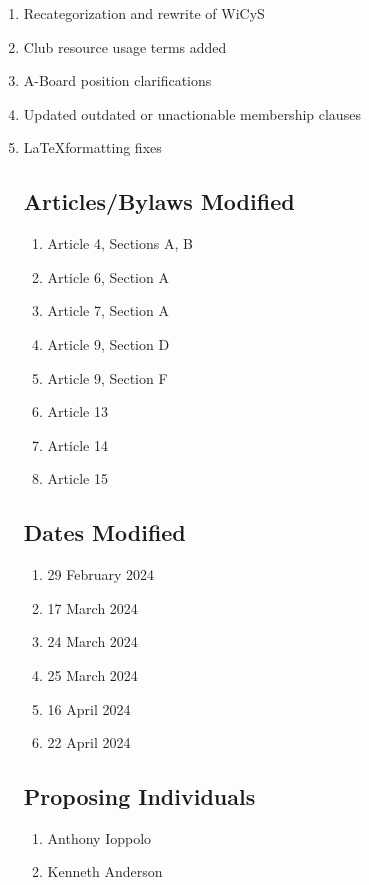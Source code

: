 \begin{enumerate}
      \item Recategorization and rewrite of WiCyS
      \item Club resource usage terms added
      \item A-Board position clarifications
      \item Updated outdated or unactionable membership clauses
      \item \LaTeX\space formatting fixes

            \subsection{Articles/Bylaws Modified}
            \begin{enumerate}
                  \item Article 4, Sections A, B 
                  \item Article 6, Section A
                  \item Article 7, Section A
                  \item Article 9, Section D
                  \item Article 9, Section F
                  \item Article 13
                  \item Article 14
                  \item Article 15
            \end{enumerate}

            \subsection{Dates Modified}
            \begin{enumerate}
                  \item 29 February 2024
                  \item 17 March 2024
                  \item 24 March 2024
                  \item 25 March 2024
                  \item 16 April 2024
                  \item 22 April 2024
            \end{enumerate}

            \subsection{Proposing Individuals}
            \begin{enumerate}
                  \item Anthony Ioppolo
                  \item Kenneth Anderson
            \end{enumerate}
\end{enumerate}

